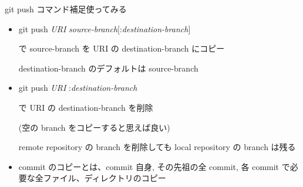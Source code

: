 \begin{frame}[t]{git push コマンド補足}{使ってみる}

  \begin{itemize}
  \item git push \textit{URI} \textit{source-branch}[:\textit{destination-branch}]

    で source-branch を URI の destination-branch にコピー

    destination-branch のデフォルトは source-branch
    \vspace{2ex}

  \item git push \textit{URI} :\textit{destination-branch}

    で URI の destination-branch を削除

    (空の branch をコピーすると思えば良い)

    remote repository の branch を削除しても local repository の branch は残る
    \vspace{2ex}

  \item commit のコピーとは、commit 自身, その先祖の全 commit, 各 commit で必要な全ファイル、ディレクトリのコピー
  \end{itemize}

\end{frame}
